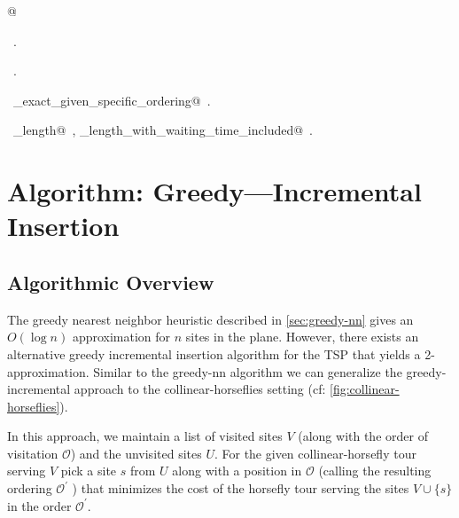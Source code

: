 \documentclass[11.5pt]{report}
\begin{document}
\begin{flushleft}
\begin{list}{}{}
\mbox{}\verb@   @\\
\mbox{}\verb@@{\NWsep}
\end{list}
\vspace{-1.5ex}
\footnotesize
\begin{list}{}{\setlength{\itemsep}{-\parsep}\setlength{\itemindent}{-\leftmargin}}
\item \NWtxtMacroDefBy\ .
\item \NWtxtMacroRefIn\ .
\item \NWtxtIdentsDefed\nobreak\  \verb@algo_exact_given_specific_ordering@\nobreak\ .\item \NWtxtIdentsUsed\nobreak\  \verb@tour_length@\nobreak\ , \verb@tour_length_with_waiting_time_included@\nobreak\ .
\item{}
\end{list}
\vspace{4ex}
\end{flushleft}
\section{Algorithm: Greedy---Incremental Insertion}
\subsection*{Algorithmic Overview}
\newchunk The greedy nearest neighbor heuristic described in \autoref{sec:greedy-nn} gives an $O(\log n)$ 
          approximation for $n$ sites in the plane. However, there exists an alternative greedy incremental 
          insertion algorithm for the TSP that yields a 2-approximation. Similar to the greedy-nn algorithm 
          we can generalize the greedy-incremental approach to the collinear-horseflies setting 
          (cf: \autoref{fig:collinear-horseflies}). 

\newchunk In this approach, we maintain a list of visited sites $V$ (along with the order of visitation 
          $\mathcal{O}$) and the unvisited sites $U$. For the given collinear-horsefly tour serving $V$ 
          pick a site $s$ from $U$ along with a position in $\mathcal{O}$ (calling the resulting ordering  
          $\mathcal{O^{'}}$  ) that minimizes the cost of the horsefly tour serving the sites $V \cup \{s\}$ 
          in the order $\mathcal{O^{'}}$. 
\end{document}

